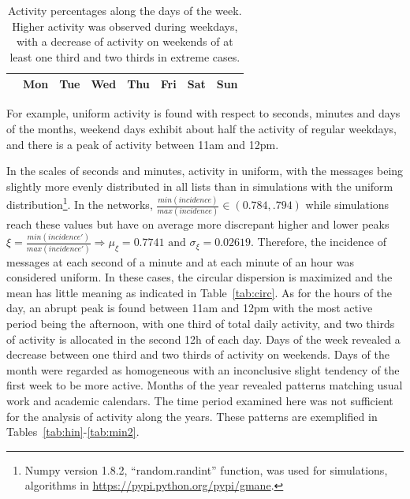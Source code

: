 \documentclass[%
	aip,
	jmp,%
	amsmath,amssymb,
	reprint,%
]{revtex4-1}
\begin{document}
\begin{table}
	\caption{Activity percentages along the days of the week.
	Higher activity was observed during weekdays, with a decrease of activity on weekends of at least one third and two thirds in extreme cases.}
	\begin{center}
		\begin{tabular}{ | l ||  c | c | c | c | c |   c | c |}
			\hline
			& Mon & Tue & Wed & Thu & Fri & Sat & Sun  \\ \hline
			
		\end{tabular}
	\end{center}
	\label{tab:win}
\end{table}
For example, uniform activity is found with respect to seconds, minutes and days of the months,
weekend days exhibit about half the activity of regular weekdays,
and there is a peak of activity between 11am and 12pm.

In the scales of seconds and minutes, activity in uniform,
with the messages being slightly more evenly distributed in all lists than in simulations with the uniform distribution\footnote{Numpy version 1.8.2, ``random.randint'' function, was used for simulations, algorithms in \url{https://pypi.python.org/pypi/gmane}.}.
In the networks, $\frac{min(incidence)}{max(incidence)} \in (0.784,.794)$ while simulations reach these values but have on average more discrepant higher and lower peaks $\xi=\frac{min(incidence')}{max(incidence')} \Rightarrow \mu_\xi=0.7741 \text{ and } \sigma_\xi=0.02619$.
Therefore, the incidence of messages at each second of a minute and at each minute of an hour was considered uniform.
In these cases, the circular dispersion is maximized and the mean has little meaning as indicated in Table~\ref{tab:circ}.
As for the hours of the day, an abrupt peak is found between 11am and 12pm with the most active period being the afternoon, with one third of total daily activity, and two thirds of activity is allocated in the second 12h of each day.
Days of the week revealed a decrease between one third and two thirds of activity on weekends.
Days of the month were regarded as homogeneous with an inconclusive slight tendency of the first week to be more active.
Months of the year revealed patterns matching usual work and academic calendars.
The time period examined here was not sufficient for the analysis of activity along the years. These patterns are exemplified in Tables~\ref{tab:hin}-\ref{tab:min2}.


\FloatBarrier
\end{document}
